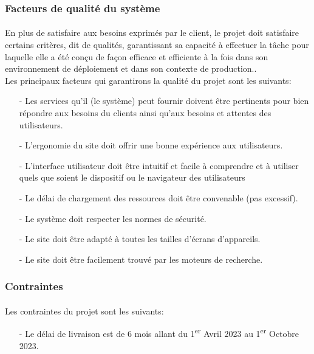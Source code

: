 		\subsubsection{Facteurs de qualit\'e du syst\`eme}
		\label{SectQualiteDuSysteme}
			\paragraph{} En plus de satisfaire aux besoins exprim\'es par le client, le projet doit satisfaire certains crit\`eres, dit de qualit\'es, garantissant sa capacit\'e \`a effectuer la t\^ache pour laquelle elle a \'et\'e con\c{c}u de fa\c{c}on efficace et efficiente \`a la fois dans son environnement de d\'eploiement et dans son contexte de production.\cite{FacteursDeQualiteDUnSysteme}.
			\\
			Les principaux facteurs qui garantirons la qualit\'e du projet sont les suivants:
			\begin{itemize}
				\item[-] Les services qu'il (le syst\`eme) peut fournir doivent \^etre pertinents pour bien r\'epondre aux besoins du clients ainsi qu'aux besoins et attentes des utilisateurs.
				\item[-] L'ergonomie du site doit offrir une bonne exp\'erience aux utilisateurs.
				\item[-] L'interface utilisateur doit \^etre intuitif et facile \`a comprendre et \`a utiliser quels que soient le dispositif ou le navigateur des utilisateurs
				\item[-] Le d\'elai de chargement des ressources doit \^etre convenable (pas excessif).
				\item[-] Le syst\`eme doit respecter les normes de s\'ecurit\'e.
				\item[-] Le site doit \^etre adapt\'e \`a toutes les tailles d'\'ecrans d'appareils.
				\item[-] Le site doit \^etre facilement trouv\'e par les moteurs de recherche.
			\end{itemize}

		\subsubsection{Contraintes}
			\paragraph{} Les contraintes du projet sont les suivants:
				\begin{itemize}
					\item[-] Le d\'elai de livraison est de 6 mois allant du 1\textsuperscript{er} Avril 2023 au 1\textsuperscript{er} Octobre 2023.
				\end{itemize}

